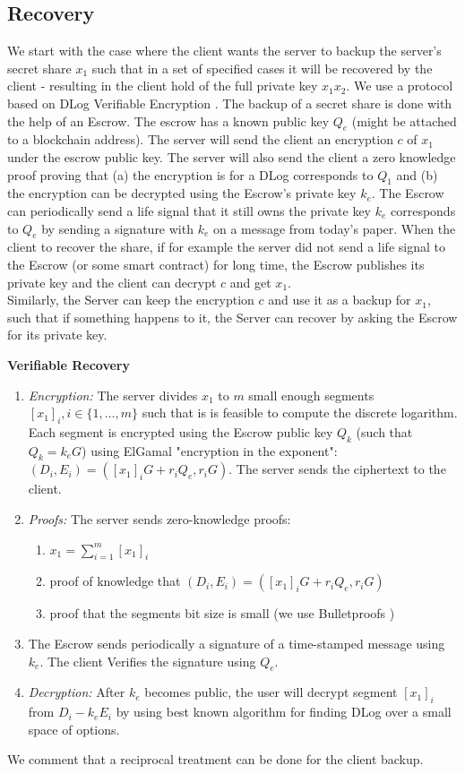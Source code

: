 \documentclass[runningheads]{llncs}
\begin{document}
{{\subsection{Recovery}  
We start with the case where the client wants the server to backup the server's secret share $x_1$ such that in a set of specified cases it will be recovered by the client - resulting in the client hold of the full private key $x_1x_2$. We use a protocol based on DLog Verifiable Encryption \cite{cs03}. The backup of a secret share is done with the help of an Escrow. The escrow has a known public key $Q_e$ (might be attached to a blockchain address). The server will send the client an encryption $c$ of $x_1$ under the escrow public key. The server will also send the client a zero knowledge proof proving that (a) the encryption is for a DLog corresponds to $Q_1$ and (b) the encryption can be decrypted using the Escrow's private key $k_e$. The Escrow can periodically send a life signal that it still owns the private key $k_e$ corresponds to $Q_e$ by sending a signature with $k_e$ on a message from today's paper. When the client to recover the share, if for example the server did not send a life signal to the Escrow (or some smart contract) for long time, the Escrow publishes its private key and the client can decrypt $c$ and get $x_1$. \\
Similarly, the Server can keep the encryption $c$ and use it as a backup for $x_1$, such that if something happens to it, the Server can recover by asking the Escrow for its private key. 
\begin{mdframed}[userdefinedwidth = 12.3cm]
\textbf{Verifiable Recovery}
\begin{enumerate}

\item \textit{Encryption:} The server divides $x_1$ to $m$ small enough segments $[x_1]_i, i\in \{1,...,m\}$ such that is is feasible to compute the discrete logarithm. Each segment is encrypted using the Escrow public key $Q_k$ (such that $Q_k = k_eG$) using ElGamal "encryption in the exponent": $(D_i, E_i) = ([x_1]_iG+r_iQ_e, r_iG)$. The server sends the ciphertext to the client.
\item \textit{Proofs:} The server sends zero-knowledge proofs:
\begin{enumerate}
    \item $x_1 = \sum_{i=1}^{m}{[x_1]_i}$
    \item proof of knowledge that $(D_i, E_i) = ([x_1]_iG+r_iQ_e, r_iG)$
    \item proof that the segments bit size is small (we use Bulletproofs \cite{bulletproof})
\end{enumerate}
\item The Escrow sends periodically a signature of a time-stamped message using $k_e$. The client Verifies the signature using $Q_e$.
\item \textit{Decryption:} After $k_e$ becomes public, the user will decrypt segment $[x_1]_i$ from $D_i - k_eE_i$ by using best known algorithm for finding DLog over a small space of options. 
\end{enumerate}
\end{mdframed}
We comment that a reciprocal treatment can be done for the client backup.

}}
\end{document}

